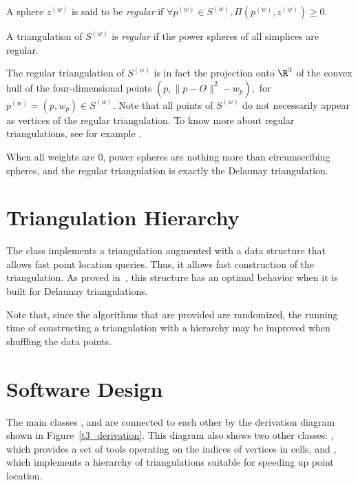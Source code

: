 A sphere ${z}^{(w)}$ is said to be
\textit{regular} if $\forall {p}^{(w)}\in{S}^{(w)},
\Pi{({p}^{(w)},{z}^{(w)})}\geq 0$.

A triangulation of ${S}^{(w)}$ is \textit{regular} if the power spheres
of all simplices are regular. 

The regular triangulation of
${S}^{(w)}$ is in fact the projection onto $\R^3$ of the convex hull 
of the four-dimensional points $(p,\|p-O\|^2-w_p),$ for
${p}^{(w)}=(p,w_p)\in{S}^{(w)}$. 
Note that all points of ${S}^{(w)}$ do not
necessarily appear as vertices of the regular
triangulation. To know more about regular triangulations, see for
example \cite{es-itfwr-96}. 

When all weights are 0, power spheres are nothing more than
circumscribing spheres, and the regular triangulation is exactly the
Delaunay triangulation.

\section{Triangulation Hierarchy} 

The class  implements a
triangulation augmented with a data structure that allows fast point
location queries. Thus, it allows fast construction of the
triangulation. As proved in~\cite{cgal:d-dh-02}, this structure has an
optimal behavior when it is built for Delaunay triangulations.

Note that, since the algorithms that are provided are randomized, the
running time of constructing a triangulation with a hierarchy may be
improved when shuffling the data points.

\section{Software Design}
\label{Triangulation3-sec-design}

The main classes ,  and
 are connected to each other by the
derivation diagram shown in Figure~\ref{t3_derivation}.  This diagram
also shows two other classes: , which provides
a set of tools operating on the indices of vertices in cells,
and , which implements a hierarchy of
triangulations suitable for speeding up point location.

